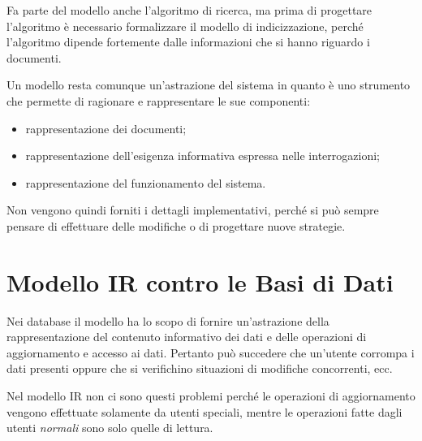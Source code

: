 Fa parte del modello anche l'algoritmo di ricerca, ma prima di progettare l'algoritmo è necessario formalizzare il modello di indicizzazione, perché l'algoritmo dipende fortemente dalle informazioni che si hanno riguardo i documenti.

Un modello resta comunque un'astrazione del sistema in quanto è uno strumento che permette di ragionare e rappresentare le sue componenti:

\begin{itemize}
	\item rappresentazione dei documenti;
	\item rappresentazione dell'esigenza informativa espressa nelle interrogazioni;
	\item rappresentazione del funzionamento del sistema.
\end{itemize}

\noindent Non vengono quindi forniti i dettagli implementativi, perché si può sempre pensare di effettuare delle modifiche o di progettare nuove strategie.

\section{Modello IR contro le Basi di Dati}

Nei database il modello ha lo scopo di fornire un'astrazione della rappresentazione del contenuto informativo dei dati e delle operazioni di aggiornamento e accesso ai dati.
Pertanto può succedere che un'utente corrompa i dati presenti oppure che si verifichino situazioni di modifiche concorrenti, ecc.

Nel modello IR non ci sono questi problemi perché le operazioni di aggiornamento vengono effettuate solamente da utenti speciali, mentre le operazioni fatte dagli utenti \textit{normali} sono solo quelle di lettura.

